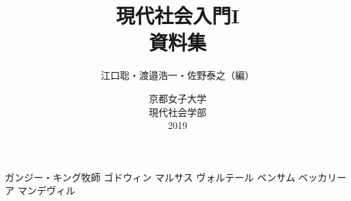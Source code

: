 \documentclass[autodetect-engine,dvipdfmx-if-dvi,ja=standard,dvipdfmx,openany,twocolumn]{bxjsreport}
\author{江口聡・渡邉浩一・佐野泰之（編）}
\date{京都女子大学\\現代社会学部\\2019}
\title{現代社会入門I\\資料集}
\begin{document}

\maketitle
\tableofcontents
% 



% 

% 
% 




% 




% 


ガンジー・キング牧師
ゴドウィン
マルサス
ヴォルテール
ベンサム
ベッカリーア
マンデヴィル

\fi %





%   
% 
\end{document}
